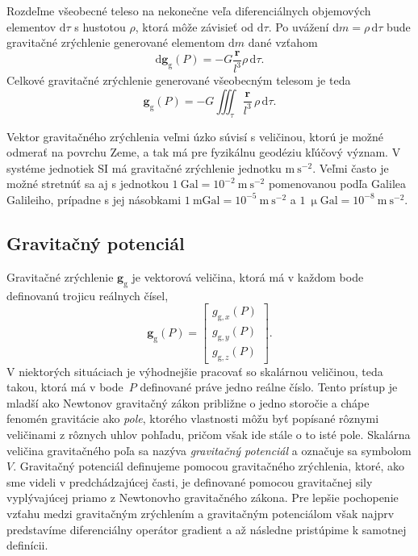 \documentclass[a4paper, 12pt]{book}
\newcommand{\diff}{\mathrm d}
\newcommand{\gidx}{\mathrm g}
\let\vec\mathbf
\begin{document}
Rozdeľme všeobecné teleso na nekonečne veľa diferenciálnych objemových 
elementov $\diff\tau$ s hustotou $\rho$, ktorá môže závisieť od $\diff\tau$.  
Po uvážení $\diff m = \rho \, \diff \tau$ bude gravitačné zrýchlenie generované 
elementom $\diff m$ dané vzťahom
%
\begin{equation}
\label{eq:gravitational_vector}
\diff \vec g_\gidx(P) = -G \frac{\vec r}{l^3} \rho \, \diff\tau{.}
\end{equation}
%
Celkové gravitačné zrýchlenie generované všeobecným telesom je teda
%
\begin{equation}
\label{eq:gravitational_vector_integral}
\vec g_\gidx(P) = -G \iiint_{\tau} \frac{\vec r}{l^3} \, \rho \, \diff\tau{.}
\end{equation}

Vektor gravitačného zrýchlenia veľmi úzko súvisí s veličinou, ktorú je možné 
odmerať na povrchu Zeme, a tak má pre fyzikálnu geodéziu kľúčový význam.  
V systéme jednotiek SI má gravitačné zrýchlenie jednotku $\mathrm{m}\ 
\mathrm{s}^{-2}$.  Veľmi často je možné stretnúť sa aj s jednotkou $1\ 
\mathrm{Gal} = 10^{-2}\ \mathrm{m}\ \mathrm{s}^{-2}$ pomenovanou podľa Galilea 
Galileiho, prípadne s jej násobkami $1\ \mathrm{mGal} = 10^{-5}\ \mathrm{m}\ 
\mathrm{s}^{-2}$ a $1\ \upmu \mathrm{Gal} = 10^{-8}\ \mathrm{m}\ 
\mathrm{s}^{-2}$.

\subsection{Gravitačný potenciál}

Gravitačné zrýchlenie $\vec g_\gidx$ je vektorová veličina, ktorá má v každom 
bode definovanú trojicu reálnych čísel,
%
\begin{equation}
\vec g_{\gidx}(P) =
\begin{bmatrix}
g_{\gidx,x}(P) \\[2ex]
g_{\gidx,y}(P) \\[2ex]
g_{\gidx,z}(P)
\end{bmatrix}
{.}
\end{equation}
%
V niektorých situáciach je výhodnejšie pracovať so skalárnou veličinou, teda 
takou, ktorá má v bode~$P$ definované práve jedno reálne číslo.  Tento prístup 
je mladší ako Newtonov gravitačný zákon približne o jedno storočie 
\citep{Jekeli2015} a chápe fenomén gravitácie ako \emph{pole}, ktorého 
vlastnosti môžu byť popísané rôznymi veličinami z rôznych uhlov pohľadu, pričom 
však ide stále o to isté pole.  Skalárna veličina gravitačného poľa sa nazýva 
\emph{gravitačný potenciál} a označuje sa symbolom $V$.  Gravitačný potenciál 
definujeme pomocou gravitačného zrýchlenia, ktoré, ako sme videli 
v predchádzajúcej časti, je definované pomocou gravitačnej sily vyplývajúcej 
priamo z Newtonovho gravitačného zákona.  Pre lepšie pochopenie vzťahu medzi 
gravitačným zrýchlením a gravitačným potenciálom však najprv predstavíme 
diferenciálny operátor gradient a až následne pristúpime k samotnej definícii.
\end{document}
